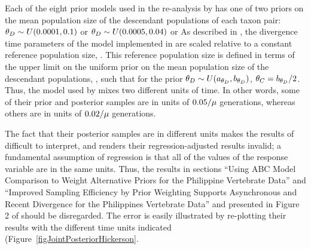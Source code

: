\documentclass[letterpaper,12pt]{article}
\begin{document}
\begin{linenumbers}
Each of the eight prior models used in the re-analysis by \citet{Hickerson2013}
has one of two priors on the mean population size of the descendant populations
of each taxon pair:
$\meanDescendantTheta{} \sim U(0.0001, 0.1)$ or
$\meanDescendantTheta{} \sim U(0.0005, 0.04)$ or
As described in \citet{Oaks2012}, the divergence time parameters of the model
implemented in \msb are scaled relative to a constant reference population
size, .
This reference population size is defined in terms of the upper limit on the
uniform prior on the mean population size of the descendant populations,
\meanDescendantTheta{}, such that for the prior $\meanDescendantTheta{} \sim
U(\uniformMin{\meanDescendantTheta{}},\uniformMax{\meanDescendantTheta{}})$,
$\myTheta{C} = \uniformMax{\meanDescendantTheta{}}/2$.
Thus, the model used by \citet{Hickerson2013} mixes two different units of
time.
In other words, some of their prior and posterior samples are in units of
$0.05/\mu$ generations, whereas others are in units of
$0.02/\mu$ generations.

The fact that their posterior samples are in different units makes the results
of \citet{Hickerson2013} difficult to interpret, and renders their
regression-adjusted results invalid; a fundamental assumption of regression is
that all of the values of the response variable are in the same units.
Thus, the results in sections ``Using ABC Model Comparison to Weight
Alternative Priors for the Philippine Vertebrate Data'' and ``Improved Sampling
Efficiency by Prior Weighting Supports Asynchronous and Recent Divergence for
the Philippines Vertebrate Data'' and presented in Figure 2 of
\citet{Hickerson2013} should be disregarded.
The error is easily illustrated by re-plotting their results with the different
time units indicated (Figure~\ref{figJointPosteriorHickerson}.




\end{linenumbers}
\end{document}
